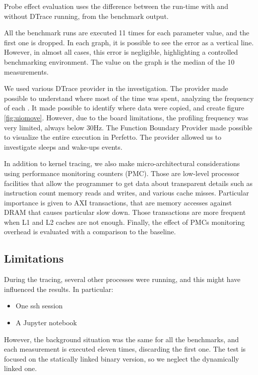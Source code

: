 \documentclass[a4paper,10pt]{article}
\begin{document}
Probe effect evaluation uses the difference between the run-time with and without DTrace running, from the benchmark output.

All the benchmark runs are executed 11 times for each parameter value, and the first one is dropped. In each graph, it is possible to see the error as a vertical line. However, in almost all cases, this error is negligible, highlighting a controlled benchmarking environment. The value on the graph is the median of the 10 measurements.

We used various DTrace provider in the investigation. The  provider made possible to understand where most of the time was spent, analyzing the frequency of each . It made possible to identify where data were copied, and create figure \ref{fig:uiomove}. However, due to the board limitations, the profiling frequency was very limited, always below 30Hz. The Function Boundary Provider made possible to visualize the entire execution in Perfetto\cite{noauthor_perfetto_nodate}. The  provider allowed us to investigate sleeps and wake-ups events.

In addition to kernel tracing, we also make micro-architectural considerations using performance monitoring counters (PMC). Those are low-level processor facilities that allow the programmer to get data about transparent details such as instruction count memory reads and writes, and various cache misses. Particular importance is given to AXI transactions, that are memory accesses against DRAM that causes particular slow down. Those transactions are more frequent when L1 and L2 caches are not enough.
Finally, the effect of PMCs monitoring overhead is evaluated with a comparison to the baseline.


\subsection{Limitations}

During the tracing, several other processes were running, and this might have influenced the results. In particular:
\begin{itemize}
    \item One ssh session
    \item A Jupyter notebook
\end{itemize}

However, the background situation was the same for all the benchmarks, and each measurement is executed eleven times, discarding the first one. The test is focused on the statically linked binary version, so we neglect the dynamically linked one.
\end{document}
